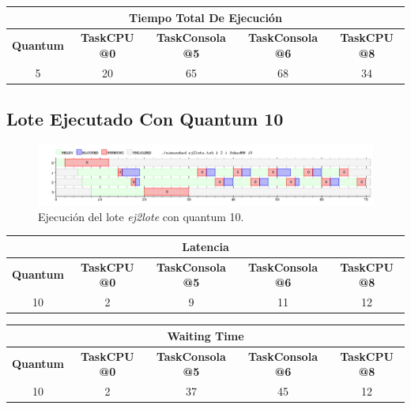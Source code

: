 \begin{center}
	\begin{tabular}{|c|c|c|c|c|}
		\hline
		\multicolumn{5}{|c|}{\large{\textbf{Tiempo Total De Ejecución}}} \\
		\hline
		\textbf{Quantum} & \textbf{TaskCPU @0} & \textbf{TaskConsola @5} & \textbf{TaskConsola @6} & \textbf{TaskCPU @8} \\
		\hline
		5 & 20 & 65 & 68 & 34 \\
		\hline
	\end{tabular}
\end{center}

\subsection{Lote Ejecutado Con Quantum 10}

\begin{figure}[!h]
	\begin{center}
		\includegraphics[width=500px]{imagenes/ej5_10.png}
		\caption{Ejecución del lote \emph{ej2lote} con quantum 10.}
		\label{fig:grafico_ej5_10}
	\end{center}
\end{figure}

\begin{center}
	\begin{tabular}{|c|c|c|c|c|}
		\hline
		\multicolumn{5}{|c|}{\large{\textbf{Latencia}}} \\
		\hline
		\textbf{Quantum} & \textbf{TaskCPU @0} & \textbf{TaskConsola @5} & \textbf{TaskConsola @6} & \textbf{TaskCPU @8} \\
		\hline
		10 & 2 & 9 & 11 & 12 \\
		\hline
	\end{tabular}
\end{center}

\begin{center}
	\begin{tabular}{|c|c|c|c|c|}
		\hline
		\multicolumn{5}{|c|}{\large{\textbf{Waiting Time}}} \\
		\hline
		\textbf{Quantum} & \textbf{TaskCPU @0} & \textbf{TaskConsola @5} & \textbf{TaskConsola @6} & \textbf{TaskCPU @8} \\
		\hline
		10 & 2 & 37 & 45 & 12 \\
		\hline
	\end{tabular}
\end{center}

